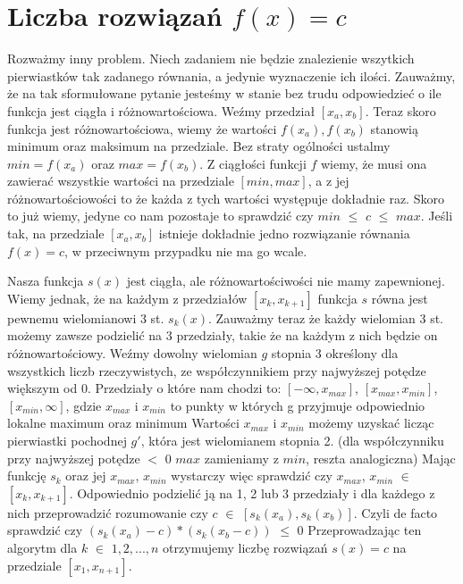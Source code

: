 \documentclass[paper=a4, fontsize=11pt]{scrartcl} %
\numberwithin{equation}{section} %
\numberwithin{figure}{section} %
\numberwithin{table}{section} %
\begin{document}
\section{Liczba rozwiązań $f(x) = c$}
Rozważmy inny problem. Niech zadaniem nie będzie znalezienie wszytkich pierwiastków tak zadanego równania, a jedynie wyznaczenie ich ilości. \medbreak
Zauważmy, że na tak sformułowane pytanie jesteśmy w stanie bez trudu odpowiedzieć o ile funkcja jest ciągła i różnowartościowa. \medbreak  \medbreak
Weźmy przedział $[x_{a}, x_{b}]$. \medbreak
Teraz skoro funkcja jest różnowartościowa, wiemy że wartości $f(x_{a}), f(x_{b})$ stanowią minimum oraz maksimum na przedziale. \medbreak 
Bez straty ogólności ustalmy $min = f(x_{a})$ oraz  $max = f(x_{b})$.
 Z ciągłości funkcji $f$ wiemy, że musi ona zawierać wszystkie wartości na przedziale $[min, max]$, a z jej różnowartościowości to że każda z tych wartości występuje dokładnie raz. 
Skoro to już wiemy, jedyne co nam pozostaje to sprawdzić czy $min$ $\leqslant$ $c$ $\leqslant$ $max$. Jeśli tak, na przedziale $[x_{a}, x_{b}]$ istnieje dokładnie jedno rozwiązanie równania $f(x) = c$, w przeciwnym przypadku nie ma go wcale. \medbreak \medbreak

Nasza funkcja $s(x)$ jest ciągła, ale różnowartościwości nie mamy zapewnionej. Wiemy jednak, że na każdym z przedziałów $[x_{k}, x_{k+1}]$ funkcja $s$ równa jest pewnemu wielomianowi 3 st. $s_{k}(x)$. Zauważmy teraz że każdy wielomian 3 st. możemy zawsze podzielić na 3 przedziały, takie że na każdym z nich będzie on różnowartościowy. \medbreak
Weźmy dowolny wielomian $g$ stopnia 3 określony dla wszystkich liczb rzeczywistych, ze współczynnikiem przy najwyższej potędze większym od $0$. \medbreak
Przedziały o które nam chodzi to: \medbreak
 $[-\infty,x_{max}]$, $[x_{max}, x_{min}]$, $[x_{min}, \infty]$, \medbreak
gdzie $x_{max}$ i $x_{min}$ to punkty w których g przyjmuje odpowiednio lokalne maximum oraz minimum \medbreak
Wartości $x_{max}$ i $x_{min}$ możemy uzyskać licząc pierwiastki pochodnej $g'$, która jest wielomianem stopnia 2. \medbreak
(dla współczynniku przy najwyższej potędze $<$ 0 $max$ zamieniamy z $min$, reszta analogiczna)
\medbreak \medbreak
Mając funkcję $s_{k}$ oraz jej $x_{max}$, $x_{min}$ wystarczy więc sprawdzić czy $x_{max}$, $x_{min}$  $\in$ $[x_{k}, x_{k+1}]$. Odpowiednio podzielić ją na 1, 2 lub 3 przedziały i dla każdego z nich przeprowadzić rozumowanie czy $c$ $\in$ $[s_{k}(x_{a}), s_{k}(x_{b})]$. 
Czyli de facto sprawdzić czy $(s_{k}(x_{a}) - c) * (s_{k}(x_{b} - c))$ $\leqslant$ $0$ \medbreak
Przeprowadzając ten algorytm dla $k$ $\in$ $1, 2, ... , n$ otrzymujemy liczbę rozwiązań $s(x) = c$ na przedziale $[x_{1}, x_{n+1}]$. \medbreak \medbreak
\end{document}
